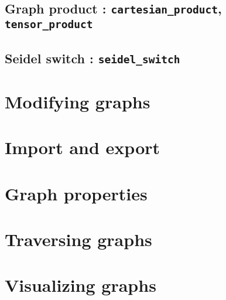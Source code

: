 \documentclass[a4paper,11pt]{article}
\begin{document}
\subsection{Graph product : {\tt cartesian\_product}, {\tt tensor\_product}}

\subsection{Seidel switch : {\tt seidel\_switch}}

\section{Modifying graphs}

\section{Import and export}

\section{Graph properties}

\section{Traversing graphs}

\section{Visualizing graphs}
\end{document}
